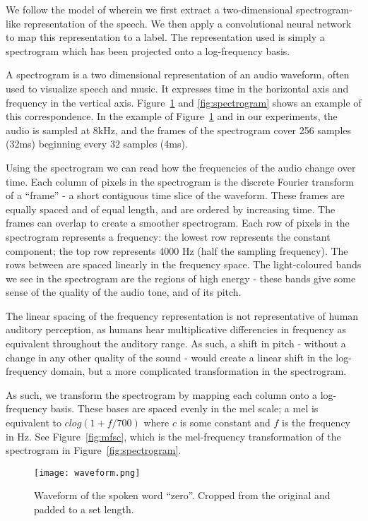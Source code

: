 We follow the model of \cite{abdel2014convolutional} wherein we first extract a two-dimensional spectrogram-like representation of the speech. We then apply a convolutional neural network to map this representation to a label. The representation used is simply a spectrogram which has been projected onto a log-frequency basis.

A spectrogram is a two dimensional representation of an audio waveform, often used to visualize speech and music. It expresses time in the horizontal axis and frequency in the vertical axis. Figure~\ref{fig:waveform} and \ref{fig:spectrogram} shows an example of this correspondence. In the example of Figure~\ref{fig:waveform} and in our experiments, the audio is sampled at 8kHz, and the frames of the spectrogram cover 256 samples (32ms) beginning every 32 samples (4ms).

Using the spectrogram we can read how the frequencies of the audio change over time. Each column of pixels in the spectrogram is the discrete Fourier transform of a ``frame'' - a short contiguous time slice of the waveform. These frames are equally spaced and of equal length, and are ordered by increasing time. The frames can overlap to create a smoother spectrogram. Each row of pixels in the spectrogram represents a frequency: the lowest row represents the constant component; the top row represents 4000 Hz (half the sampling frequency). The rows between are spaced linearly in the frequency space. The light-coloured bands we see in the spectrogram are the regions of high energy - these bands give some sense of the quality of the audio tone, and of its pitch.

The linear spacing of the frequency representation is not representative of human auditory perception, as humans hear multiplicative differencies in frequency as equivalent throughout the auditory range. As such, a shift in pitch - without a change in any other quality of the sound - would create a linear shift in the log-frequency domain, but a more complicated transformation in the spectrogram.

As such, we transform the spectrogram by mapping each column onto a log-frequency basis. These bases are spaced evenly in the mel scale; a mel is equivalent to $c log(1 + f / 700)$ where $c$ is some constant and $f$ is the frequency in Hz. See Figure~\ref{fig:mfsc}, which is the mel-frequency transformation of the spectrogram in Figure~\ref{fig:spectrogram}.


\begin{figure}
\centering
\texttt{[image: waveform.png]}
\caption{Waveform of the spoken word ``zero''. Cropped from the original and padded to a set length.}
\label{fig:waveform}
\end{figure}


